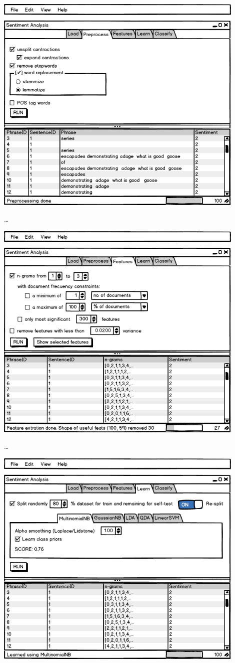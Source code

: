 \includegraphics[width=12cm]{gui-2-preprocess}

\ldots

\includegraphics[width=12cm]{gui-3-features}

\ldots

\includegraphics[width=12cm]{gui-4-learn}

